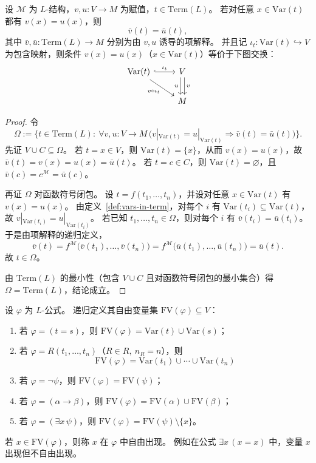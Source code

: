 \documentclass[lang=cn,a4paper,newtx,section]{elegantbook}
\begin{document}
\begin{lemma}[项的解释只依赖其出现变量]
\label{term-depends-on-vars}
设 $\mathcal M$ 为 $L$-结构，$v,u:V\to M$ 为赋值，$t\in\mathrm{Term}(L)$。
若对任意 $x\in\mathrm{Var}(t)$ 都有 $v(x)=u(x)$，则
\[
  \bar v(t)=\bar u(t),
\]
其中 $\bar v,\bar u:\mathrm{Term}(L)\to M$ 分别为由 $v,u$ 诱导的项解释。
并且记 $\iota_t:\mathrm{Var}(t)\hookrightarrow V$ 为包含映射，则条件 $v(x)=u(x)$（$x\in\mathrm{Var}(t)$）等价于下图交换：
\[
\begin{tikzcd}
\mathrm{Var}(t) \arrow[r, hook, "\iota_t"] \arrow[dr, "v\circ\iota_t"'] & V \arrow[d, shift left, "v"] \arrow[d, shift right, "u"'] \\
& M
\end{tikzcd}
\]
\end{lemma}

\begin{proof}
令
\[
  \Omega:=\{t\in\mathrm{Term}(L):\ \forall v,u:V\to M\,\bigl(v|_{\mathrm{Var}(t)}=u|_{\mathrm{Var}(t)}\Rightarrow \bar v(t)=\bar u(t)\bigr)\}.
\]
先证 $V\cup C\subseteq\Omega$。
若 $t=x\in V$，则 $\mathrm{Var}(t)=\{x\}$，从而 $v(x)=u(x)$，故 $\bar v(t)=v(x)=u(x)=\bar u(t)$。
若 $t=c\in C$，则 $\mathrm{Var}(t)=\varnothing$，且 $\bar v(c)=c^{\mathcal M}=\bar u(c)$。

再证 $\Omega$ 对函数符号闭包。
设 $t=f(t_1,\dots,t_n)$，并设对任意 $x\in\mathrm{Var}(t)$ 有 $v(x)=u(x)$。
由定义~\ref{def:vars-in-term}，对每个 $i$ 有 $\mathrm{Var}(t_i)\subseteq\mathrm{Var}(t)$，故 $v|_{\mathrm{Var}(t_i)}=u|_{\mathrm{Var}(t_i)}$。
若已知 $t_1,\dots,t_n\in\Omega$，则对每个 $i$ 有 $\bar v(t_i)=\bar u(t_i)$。
于是由项解释的递归定义，
\[
  \bar v(t)=f^{\mathcal M}\bigl(\bar v(t_1),\dots,\bar v(t_n)\bigr)=f^{\mathcal M}\bigl(\bar u(t_1),\dots,\bar u(t_n)\bigr)=\bar u(t).
\]
故 $t\in\Omega$。

由 $\mathrm{Term}(L)$ 的最小性（包含 $V\cup C$ 且对函数符号闭包的最小集合）得 $\Omega=\mathrm{Term}(L)$，结论成立。
\end{proof}

\begin{definition}[公式中的自由出现与自由变量]
\label{free-vars-in-formula}
设 $\varphi$ 为 $L$-公式。
递归定义其自由变量集 $\mathrm{FV}(\varphi)\subseteq V$：
\begin{enumerate}
  \item 若 $\varphi=(t=s)$，则 $\mathrm{FV}(\varphi)=\mathrm{Var}(t)\cup\mathrm{Var}(s)$；
  \item 若 $\varphi=R(t_1,\dots,t_n)$（$R\in R,\ n_R=n$），则
  \[
    \mathrm{FV}(\varphi)=\mathrm{Var}(t_1)\cup\cdots\cup\mathrm{Var}(t_n)
  \]
  \item 若 $\varphi=\neg\psi$，则 $\mathrm{FV}(\varphi)=\mathrm{FV}(\psi)$；
  \item 若 $\varphi=(\alpha\to\beta)$，则 $\mathrm{FV}(\varphi)=\mathrm{FV}(\alpha)\cup\mathrm{FV}(\beta)$；
  \item 若 $\varphi=(\exists x\,\psi)$，则 $\mathrm{FV}(\varphi)=\mathrm{FV}(\psi)\setminus\{x\}$。
\end{enumerate}
若 $x\in\mathrm{FV}(\varphi)$，则称 $x$ 在 $\varphi$ 中自由出现。
例如在公式 $\exists x\,(x=x)$ 中，变量 $x$ 出现但不自由出现。
\end{definition}
\end{document}
